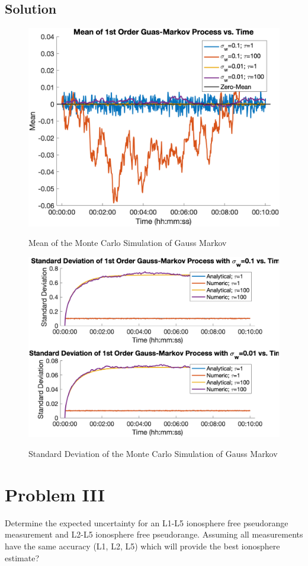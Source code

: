 \documentclass{article}
\begin{document}
\subsection*{Solution}
\begin{figure}[H]
    \centering
    \includegraphics[width=0.75\linewidth]{../figures/p2_gm_mean.png}\label{fig:p2_gm_mean}
    \caption{Mean of the Monte Carlo Simulation of Gauss Markov}
\end{figure}

\begin{figure}[H]
    \centering
    \includegraphics[width=0.75\linewidth]{../figures/p2_gm_sigma.png}\label{fig:p2_gm_sigma}
    \caption{Standard Deviation of the Monte Carlo Simulation of Gauss Markov}
\end{figure}

\section*{Problem III}
Determine the expected uncertainty for an L1-L5 ionosphere free pseudorange measurement
and L2-L5 ionosphere free pseudorange. Assuming all measurements have the same
accuracy (L1, L2, L5) which will provide the best ionosphere estimate?
\end{document}
